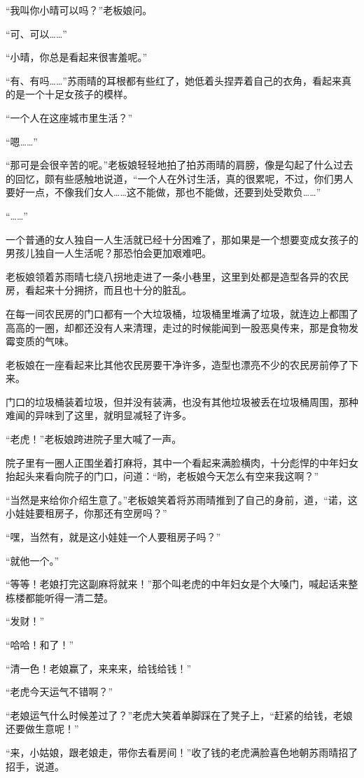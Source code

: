 “我叫你小晴可以吗？”老板娘问。

“可、可以……”

“小晴，你总是看起来很害羞呢。”

“有、有吗……”苏雨晴的耳根都有些红了，她低着头捏弄着自己的衣角，看起来真的是一个十足女孩子的模样。

“一个人在这座城市里生活？”

“嗯……”

“那可是会很辛苦的呢。”老板娘轻轻地拍了拍苏雨晴的肩膀，像是勾起了什么过去的回忆，颇有些感触地说道，“一个人在外讨生活，真的很累呢，不过，你们男人要好一点，不像我们女人……这不能做，那也不能做，还要到处受欺负……”

“……”

一个普通的女人独自一人生活就已经十分困难了，那如果是一个想要变成女孩子的男孩儿独自一人生活呢？那恐怕会更加艰难吧。

老板娘领着苏雨晴七绕八拐地走进了一条小巷里，这里到处都是造型各异的农民房，看起来十分拥挤，而且也十分的脏乱。

在每一间农民房的门口都有一个大垃圾桶，垃圾桶里堆满了垃圾，就连边上都围了高高的一圈，却都还没有人来清理，走过的时候能闻到一股恶臭传来，那是食物发霉变质的气味。

老板娘在一座看起来比其他农民房要干净许多，造型也漂亮不少的农民房前停了下来。

门口的垃圾桶装着垃圾，但并没有装满，也没有其他垃圾被丢在垃圾桶周围，那种难闻的异味到了这里，就明显减轻了许多。

“老虎！”老板娘跨进院子里大喊了一声。

院子里有一圈人正围坐着打麻将，其中一个看起来满脸横肉，十分彪悍的中年妇女抬起头来看向院子的门口，问道：“哟，老板娘今天怎么有空来我这啊？”

“当然是来给你介绍生意了。”老板娘笑着将苏雨晴推到了自己的身前，道，“诺，这小娃娃要租房子，你那还有空房吗？”

“嘿，当然有，就是这小娃娃一个人要租房子吗？”

“就他一个。”

“等等！老娘打完这副麻将就来！”那个叫老虎的中年妇女是个大嗓门，喊起话来整栋楼都能听得一清二楚。

“发财！”

“哈哈！和了！”

“清一色！老娘赢了，来来来，给钱给钱！”

“老虎今天运气不错啊？”

“老娘运气什么时候差过了？”老虎大笑着单脚踩在了凳子上，“赶紧的给钱，老娘还要做生意呢！”

“来，小姑娘，跟老娘走，带你去看房间！”收了钱的老虎满脸喜色地朝苏雨晴招了招手，说道。

